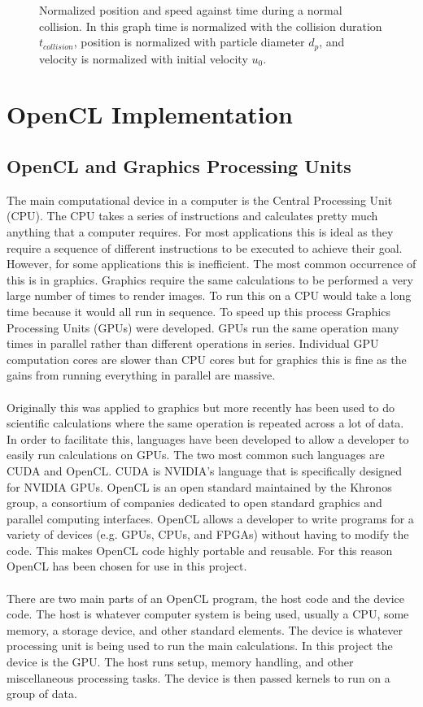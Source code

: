 \documentclass[a4paper,11pt,titlepage]{report}
\begin{document}
\begin{figure}[!htb]
\caption{Normalized position and speed against time during a normal collision. In this graph time is normalized with the collision duration $t_{collision}$, position is normalized with particle diameter $d_p$, and velocity is normalized with initial velocity $u_0$.}
\label{fig:python_friction_verification}
\end{figure}
\chapter{OpenCL Implementation}
\label{ch:OpenCL Implementation}
\section{OpenCL and Graphics Processing Units}
The main computational device in a computer is the Central Processing Unit (CPU). The CPU takes a series of instructions and calculates pretty much anything that a computer requires. For most applications this is ideal as they require a sequence of different instructions to be executed to achieve their goal. However, for some applications this is inefficient. The most common occurrence of this is in graphics. Graphics require the same calculations to be performed a very large number of times to render images. To run this on a CPU would take a long time because it would all run in sequence. To speed up this process Graphics Processing Units (GPUs) were developed. GPUs run the same operation many times in parallel rather than different operations in series. Individual GPU computation cores are slower than CPU cores but for graphics this is fine as the gains from running everything in parallel are massive.
\\\\Originally this was applied to graphics but more recently has been used to do scientific calculations where the same operation is repeated across a lot of data. In order to facilitate this, languages have been developed to allow a developer to easily run calculations on GPUs. The two most common such languages are CUDA and OpenCL. CUDA is NVIDIA's language that is specifically designed for NVIDIA GPUs. OpenCL is an open standard maintained by the Khronos group, a consortium of companies dedicated to open standard graphics and parallel computing interfaces. OpenCL allows a developer to write programs for a variety of devices (e.g. GPUs, CPUs, and FPGAs) without having to modify the code. This makes OpenCL code highly portable and reusable. For this reason OpenCL has been chosen for use in this project.
\\\\There are two main parts of an OpenCL program, the host code and the device code. The host is whatever computer system is being used, usually a CPU, some memory, a storage device, and other standard elements. The device is whatever processing unit is being used to run the main calculations. In this project the device is the GPU. The host runs setup, memory handling, and other miscellaneous processing tasks. The device is then passed kernels to run on a group of data.
\end{document}
